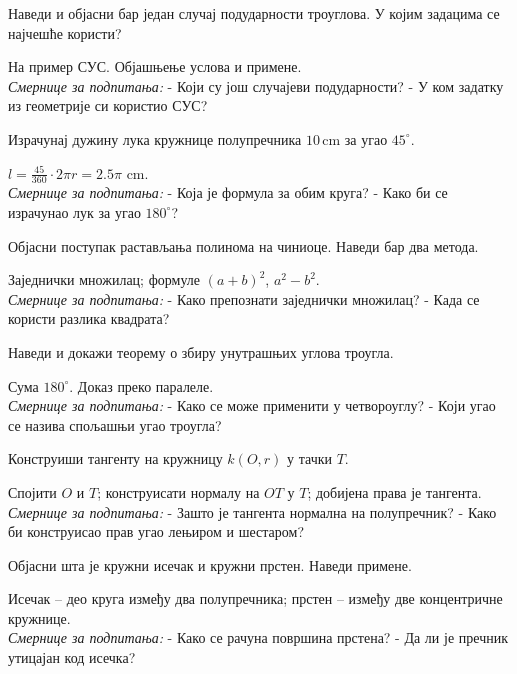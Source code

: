 \documentclass[11pt,a5paper,twoside,addpoints,answers]{exam}
\newcommand{\measure}[2]{#1\,\mathrm{#2}}
\begin{document}
\begin{questions}
\question Наведи и објасни бар један случај подударности троуглова. У којим задацима се најчешће користи?
\begin{solution}
На пример СУС. Објашњење услова и примене.  
\\[0.5em]
\textit{Смернице за подпитања:}  
- Који су још случајеви подударности?  
- У ком задатку из геометрије си користио СУС?  
\end{solution}

\question Израчунај дужину лука кружнице полупречника $\measure{10}{cm}$ за угао $45^\circ$.
\begin{solution}
$l=\frac{45}{360}\cdot 2\pi r=2.5\pi$ cm.  
\\[0.5em]
\textit{Смернице за подпитања:}  
- Која је формула за обим круга?  
- Како би се израчунао лук за угао $180^\circ$?  
\end{solution}

\question Објасни поступак растављања полинома на чиниоце. Наведи бар два метода.
\begin{solution}
Заједнички множилац; формуле $(a+b)^2$, $a^2-b^2$.  
\\[0.5em]
\textit{Смернице за подпитања:}  
- Како препознати заједнички множилац?  
- Када се користи разлика квадрата?  
\end{solution}

\question Наведи и докажи теорему о збиру унутрашњих углова троугла.
\begin{solution}
Сума $180^\circ$. Доказ преко паралеле.  
\\[0.5em]
\textit{Смернице за подпитања:}  
- Како се може применити у четвороуглу?  
- Који угао се назива спољашњи угао троугла?  
\end{solution}

\question Конструиши тангенту на кружницу $k(O,r)$ у тачки $T$.
\begin{solution}
Спојити $O$ и $T$; конструисати нормалу на $OT$ у $T$; добијена права је тангента.  
\\[0.5em]
\textit{Смернице за подпитања:}  
- Зашто је тангента нормална на полупречник?  
- Како би конструисао прав угао лењиром и шестаром?  
\end{solution}

\question Објасни шта је кружни исечак и кружни прстен. Наведи примене.
\begin{solution}
Исечак – део круга између два полупречника; прстен – између две концентричне кружнице.  
\\[0.5em]
\textit{Смернице за подпитања:}  
- Како се рачуна површина прстена?  
- Да ли је пречник утицајан код исечка?  
\end{solution}


\end{questions}
\end{document}
